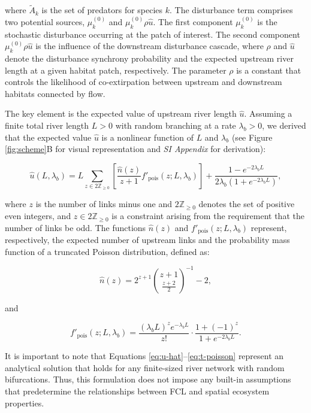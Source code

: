\documentclass[11pt, class=article, crop=false]{standalone}
\begin{document}
where $\tilde{A}_{k}$ is the set of predators for species $k$.
The disturbance term comprises two potential sources, $\mu^{(0)}_k$ and $\mu^{(0)}_k \rho \hat{u}$.
The first component $\mu^{(0)}_k$ is the stochastic disturbance occurring at the patch of interest.
The second component $\mu^{(0)}_k \rho \hat{u}$ is the influence of the downstream disturbance cascade, where $\rho$ and $\hat{u}$ denote the disturbance synchrony probability and the expected upstream river length at a given habitat patch, respectively.
The parameter $\rho$ is a constant that controls the likelihood of co-extirpation between upstream and downstream habitats connected by flow.

The key element is the expected value of upstream river length $\hat{u}$.
Assuming a finite total river length $L > 0$ with random branching at a rate $\lambda_b > 0$, we derived that the expected value $\hat{u}$ is a nonlinear function of $L$ and $\lambda_b$ (see Figure \ref{fig:scheme}B for visual representation and \textit{SI Appendix} for derivation):

\begin{equation}
    \hat{u}(L, \lambda_b) = L \sum_{z \in 2\mathbb{Z}_{\ge 0}} \left[ \frac{\hat{n}(z)}{z + 1} f'_{\text{pois}}(z; L, \lambda_b)\right] + \frac{1 - e^{-2 \lambda_b L}}{2 \lambda_b (1 + e^{-2 \lambda_b L})},
    \label{eq:u-hat}
\end{equation}

where $z$ is the number of links minus one and $2\mathbb{Z}_{\ge 0}$ denotes the set of positive even integers, and $z \in 2\mathbb{Z}_{\ge 0}$ is a constraint arising from the requirement that the number of links be odd.
The functions $\hat{n}(z)$ and $f'_{\text{pois}}(z; L, \lambda_b)$ represent, respectively, the expected number of upstream links and the probability mass function of a truncated Poisson distribution, defined as:

\begin{equation}
    \hat{n}(z) = 2^{z + 1} \binom{z + 1}{\frac{z + 2}{2}}^{-1} - 2,
    \label{eq:n-hat}
\end{equation}

and

\begin{equation}
    f'_{\text{pois}}(z; L, \lambda_b) = \frac{(\lambda_b L)^z e^{-\lambda_b L}}{z!} \cdot \frac{1 + (-1)^{z}}{1 + e^{-2\lambda_b L}}.
    \label{eq:t-poisson}
\end{equation}

It is important to note that Equations \ref{eq:u-hat}–\ref{eq:t-poisson} represent an analytical solution that holds for any finite-sized river network with random bifurcations.
Thus, this formulation does not impose any built-in assumptions that predetermine the relationships between FCL and spatial ecosystem properties.
\end{document}
